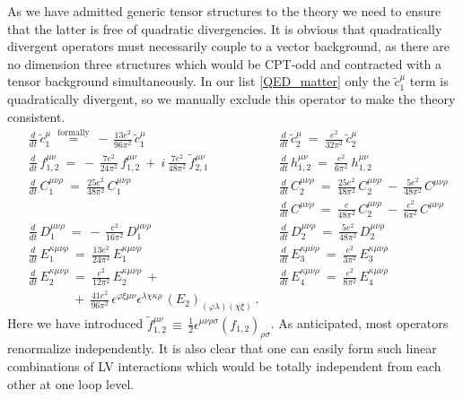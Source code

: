 \documentclass[12pt]{revtex4}
\newcommand{\wt}{\widetilde}
\begin{document}
	As we have admitted generic tensor structures to the theory
	we need to ensure that the latter is free of quadratic divergencies.
	It is obvious that quadratically divergent operators must necessarily
	couple to a vector background, as there are no dimension
	three structures which would be CPT-odd and contracted with a tensor
	background simultaneously. 
	In our list \eqref{QED_matter} only the $ \wt{c}_1^\mu $ term is
	quadratically divergent, so we manually exclude this operator
	to make the theory consistent.
\begin{align*}
	&
	\frac{d} {d t}\, \wt{c}_1^\mu ~\overset{\text{formally}}{=}~
		-\, \frac{13e^2}{96\pi^2}\, \wt{c}_1^\mu
	&&
	\frac{d} {d t}\, \wt{c}_2^\mu ~=~
		\frac{e^2}{32\pi^2}\, \wt{c}_2^\mu
	\\
	&
	\frac{d} {d t}\, f_{1,2}^{\mu\nu} ~=~
		-\, \frac{7e^2}{24\pi^2}\, f_{1,2}^{\mu\nu}
		~+~
		i\, \frac{7e^2}{48\pi^2}\, \wt{f}{}_{2,1}^{\mu\nu}
	&&
	\frac{d} {d t}\, h_{1,2}^{\mu\nu} ~=~
		\frac{e^2}{6\pi^2}\ h_{1,2}^{\mu\nu} 
	\\
	&
	\frac{d} {d t}\, C_1^{\mu\nu\rho} ~=~
		\frac{25e^2}{48\pi^2}\, C_1^{\mu\nu\rho}
	&&
	\frac{d} {d t}\, C_2^{\mu\nu\rho} ~=~
		\frac{25e^2}{48\pi^2}\, C_2^{\mu\nu\rho}
		~-~
		\frac{5e^2}{48\pi^2}\, C^{\mu\nu\rho}
	\\
	&&&
	\frac{d} {d t}\, C^{\mu\nu\rho} ~=~
		\frac{e}{48\pi^2}\, C_2^{\mu\nu\rho} 
		~-~
		\frac{e^2}{6\pi^2}\, C^{\mu\nu\rho}
	\\
	&
	\frac{d} {d t}\, D_1^{\mu\nu\rho} ~=~
		-\, \frac{e^2}{16\pi^2}\, D_1^{\mu\nu\rho}
	&&
	\frac{d} {d t}\, D_2^{\mu\nu\rho} ~=~
		\frac{5e^2}{48\pi^2}\, D_2^{\mu\nu\rho}
	\\
	&
	\frac{d} {d t}\, E_1^{\kappa\mu\nu\rho} ~=~
		\frac{13e^2}{24\pi^2}\, E_1^{\kappa\mu\nu\rho}
	&&
	\frac{d} {d t}\, E_3^{\kappa\mu\nu\rho} ~=~
		\frac{e^2}{3\pi^2}\, E_3^{\kappa\mu\nu\rho}
	\\
	&
	\frac{d} {d t}\, E_2^{\kappa\mu\nu\rho} ~=~
		\frac{e^2}{12\pi^2}\, E_2^{\kappa\mu\nu\rho}
		~+~      
	&&
	\frac{d} {d t}\, E_4^{\kappa\mu\nu\rho} ~=~
		\frac{e^2}{8\pi^2}\, E_4^{\kappa\mu\nu\rho}
	\\
	&
	\phantom{\frac{d} {d t}\, E_2^{\kappa\mu\nu\rho}}
		~+~ \frac{41e^2}{96\pi^2}\,
		\epsilon^{\varphi\xi\mu\nu} 
		\epsilon^{\lambda\chi\kappa\rho}\,
		(E_2)_{(\varphi\lambda)(\chi\xi)}
	~.
\end{align*}	
	Here we have introduced $ \wt{f}{}_{1,2}^{\mu\nu} \,\equiv\, \frac{1}{2} 
		\epsilon^{\mu\nu\rho\sigma} (f_{1,2})_{\rho\sigma} $.
	As anticipated, most operators renormalize independently.
	It is also clear that one can easily form such linear combinations
	of LV interactions which would be totally independent from each other
	at one loop level.
\end{document}
